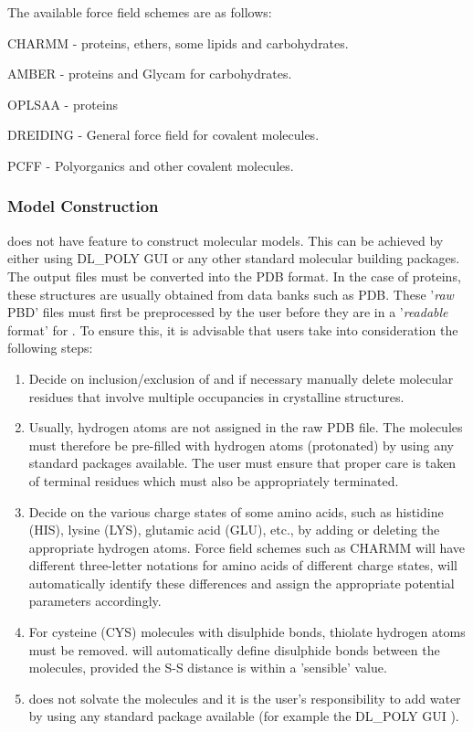 The available force field schemes are as follows:

CHARMM - proteins, ethers, some lipids and carbohydrates.

AMBER - proteins and Glycam for carbohydrates.

OPLSAA - proteins

DREIDING - General force field for covalent molecules.

PCFF - Polyorganics and other covalent molecules.

\subsubsection*{Model Construction}

\F does not have feature to construct molecular models.  This can be
achieved by either using DL\_POLY GUI \cite{smith-gui} or any
other standard molecular building packages.  The output files must be
converted into the PDB format.  In the case of proteins, these structures
are usually obtained from data banks such as PDB.  These '{\em raw} PBD'
files must first be preprocessed by the user before they are in a
'{\em readable} format' for \F.  To ensure this, it is advisable that
users take into consideration the following steps:
\begin{enumerate}
\item Decide on inclusion/exclusion of and if necessary manually delete
molecular residues that involve multiple occupancies in crystalline structures.
\item Usually, hydrogen atoms are not assigned in the raw PDB file.
The molecules must therefore be pre-filled with hydrogen atoms (protonated)
by using any standard packages available.  The user must ensure that proper
care is taken of terminal residues which must also be appropriately terminated.
\item Decide on the various charge states of some amino acids, such as
histidine (HIS), lysine (LYS), glutamic acid (GLU), etc., by adding or
deleting the appropriate hydrogen atoms.  Force field schemes such as CHARMM
will have different three-letter notations for amino acids of different charge
states, \F will automatically identify these differences and assign the
appropriate potential parameters accordingly.
\item For cysteine (CYS) molecules with disulphide bonds, thiolate hydrogen
atoms must be removed.  \F will automatically define disulphide bonds between
the molecules, provided the S-S distance is within a 'sensible' value.
\item \F does not solvate the molecules and it is the user's responsibility
to add water by using any standard package available (for example the
DL\_POLY GUI \cite{smith-gui}).
\end{enumerate}

